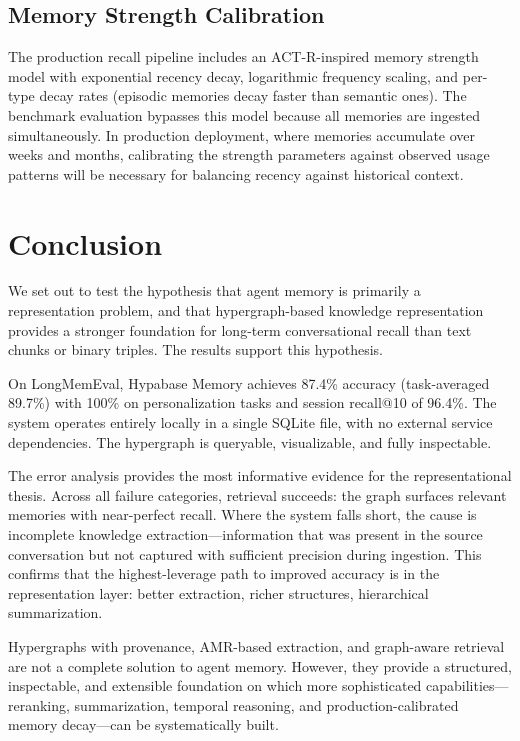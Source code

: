 \documentclass[11pt,a4paper]{article}
\begin{document}
\subsection{Memory Strength Calibration}

The production recall pipeline includes an ACT-R-inspired memory strength model with exponential recency decay, logarithmic frequency scaling, and per-type decay rates (episodic memories decay faster than semantic ones). The benchmark evaluation bypasses this model because all memories are ingested simultaneously. In production deployment, where memories accumulate over weeks and months, calibrating the strength parameters against observed usage patterns will be necessary for balancing recency against historical context.

\section{Conclusion}

We set out to test the hypothesis that agent memory is primarily a representation problem, and that hypergraph-based knowledge representation provides a stronger foundation for long-term conversational recall than text chunks or binary triples. The results support this hypothesis.

On LongMemEval, Hypabase Memory achieves 87.4\% accuracy (task-averaged 89.7\%) with 100\% on personalization tasks and session recall@10 of 96.4\%. The system operates entirely locally in a single SQLite file, with no external service dependencies. The hypergraph is queryable, visualizable, and fully inspectable.

The error analysis provides the most informative evidence for the representational thesis. Across all failure categories, retrieval succeeds: the graph surfaces relevant memories with near-perfect recall. Where the system falls short, the cause is incomplete knowledge extraction---information that was present in the source conversation but not captured with sufficient precision during ingestion. This confirms that the highest-leverage path to improved accuracy is in the representation layer: better extraction, richer structures, hierarchical summarization.

Hypergraphs with provenance, AMR-based extraction, and graph-aware retrieval are not a complete solution to agent memory. However, they provide a structured, inspectable, and extensible foundation on which more sophisticated capabilities---reranking, summarization, temporal reasoning, and production-calibrated memory decay---can be systematically built.
\end{document}
